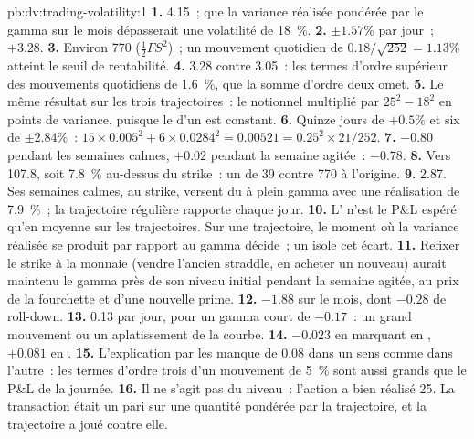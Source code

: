 \begin{solution}{pb:dv:trading-volatility:1}
\textbf{1.} 4.15~; que la variance réalisée pondérée par le gamma sur le mois dépasserait une volatilité de 18~\%.
\textbf{2.} $\pm1.57\%$ par jour~; $+3.28$.
\textbf{3.} Environ 770 ($\frac12\Gamma S^2$)~; un mouvement quotidien de $0.18/\sqrt{252}=1.13\%$ atteint le seuil de rentabilité.
\textbf{4.} 3.28 contre 3.05~: les termes d'ordre supérieur des mouvements quotidiens de 1.6~\%, que la somme d'ordre deux omet.
\textbf{5.} Le même résultat sur les trois trajectoires~: le notionnel multiplié par $25^2-18^2$ en points de variance, puisque le  d'un  est constant.
\textbf{6.} Quinze jours de $+0.5\%$ et six de $\pm2.84\%$~: $15\times0.005^2+6\times0.0284^2=0.00521=0.25^2\times21/252$.
\textbf{7.} $-0.80$ pendant les semaines calmes, $+0.02$ pendant la semaine agitée~: $-0.78$.
\textbf{8.} Vers 107.8, soit 7.8~\% au-dessus du strike~: un  de 39 contre 770 à l'origine.
\textbf{9.} 2.87. Ses semaines calmes, au strike, versent du  à plein gamma avec une réalisation de 7.9~\%~; la trajectoire régulière rapporte chaque jour.
\textbf{10.} L' n'est le P\&L espéré qu'en moyenne sur les trajectoires. Sur une trajectoire, le moment où la variance réalisée se produit par rapport au gamma décide~; un 
isole cet écart.
\textbf{11.} Refixer le strike à la monnaie (vendre l'ancien straddle, en acheter un nouveau) aurait maintenu le gamma près de son niveau initial pendant la semaine agitée, au prix de
la fourchette et d'une nouvelle prime.
\textbf{12.} $-1.88$ sur le mois, dont $-0.28$ de roll-down.
\textbf{13.} 0.13 par jour, pour un gamma court de $-0.17$~: un grand mouvement ou un aplatissement de la courbe.
\textbf{14.} $-0.023$ en marquant en , $+0.081$ en .
\textbf{15.} L'explication par les  manque de 0.08 dans un sens comme dans l'autre~: les termes d'ordre trois d'un mouvement de 5~\% sont aussi grands que le P\&L de la journée.
\textbf{16.} Il ne s'agit pas du niveau~: l'action a bien réalisé 25. La transaction était un pari sur une quantité pondérée par la trajectoire, et la trajectoire a joué contre elle.

\end{solution}

